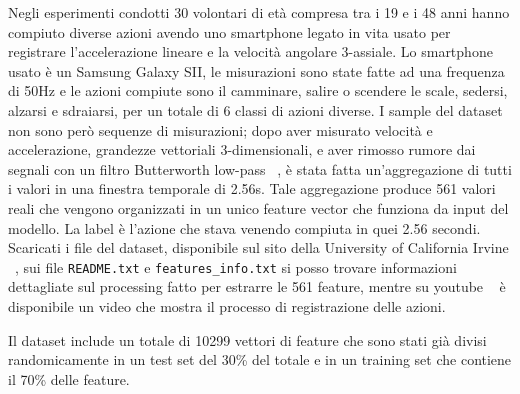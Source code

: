 Negli esperimenti condotti 30 volontari di età compresa tra i 19 e i 48 anni
hanno compiuto diverse azioni avendo uno smartphone legato in vita 
usato per registrare l'accelerazione lineare e la velocità 
angolare 3-assiale. Lo smartphone usato è un Samsung Galaxy SII, le 
misurazioni sono state fatte ad una frequenza di 50Hz e le azioni compiute
sono il camminare, salire o scendere le scale, sedersi, alzarsi e 
sdraiarsi, per un totale di 6 classi di azioni diverse.
I sample del dataset non sono però sequenze di misurazioni; dopo 
aver misurato velocità e accelerazione, grandezze vettoriali 3-dimensionali,
e aver rimosso rumore dai segnali con un filtro Butterworth low-pass 
~\cite{butterworth_filter}, è stata fatta un'aggregazione di tutti i 
valori in una finestra temporale di 2.56s. Tale aggregazione produce 
561 valori reali che vengono organizzati in un unico feature vector 
che funziona da input del modello. La label è l'azione che stava venendo
compiuta in quei 2.56 secondi.
Scaricati i file del dataset, disponibile sul sito della 
University of California Irvine ~\cite{uci_har_ds}, sui file 
\texttt{README.txt} e \texttt{features\_info.txt}
si posso trovare informazioni dettagliate sul 
processing fatto per estrarre le 561 feature, mentre su youtube 
~\cite{har_measuring_video} è disponibile un video che mostra il 
processo di registrazione delle azioni.

Il dataset include un totale di 10299 vettori di feature che sono stati
già divisi randomicamente 
in un test set del 30\% del totale e in un training set 
che contiene il 70\% delle feature.


